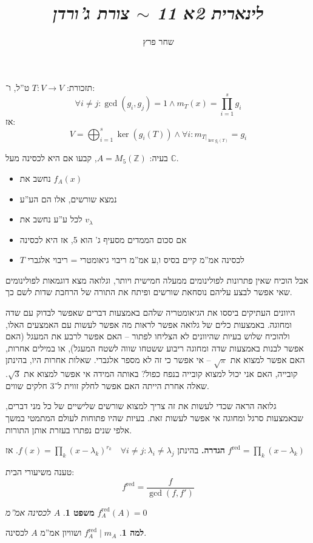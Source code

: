 \documentclass[]{article}
\author{שחר פרץ}
\title{\textit{לינארית 2א 11 $\sim$ צורת ג'ורדן}}
\newcommand\Z     {\mathbb{Z}}
\newcommand\C     {\mathbb{C}}
\newcommand\co        {\colon}
\renewcommand\lg      {\lambda}
\newtheorem{Theorem}{משפט}
\theoremstyle{definition}
\newtheorem{Lemma}{למה}
\newcommand\theo  [1] {\begin{Theorem}#1\end{Theorem}}
\newcommand\lem   [1] {\begin{Lemma}#1\end{Lemma}}
\begin{document}
    \maketitle
    תזכורת: $T \co V \to V$ ט''ל, ו־: 
    \[ \forall i \neq j \co \gcd(g_i, g_j) =1 \land m_T(x) = \prod_{i = 1}^{s}g_i \]
    אז: 
    \[ V = \bigoplus_{i = 1}^{s} \ker(g_i(T)) \land \forall i \co m_{T|_{\ker g_i(T)}} = g_i \]
    
    בעיה: $A = M_5(\Z)$, קבעו אם היא לכסינה מעל $\C$. 
    \begin{itemize}
        \item נחשב את $f_A(x)$
        \item נמצא שורשים, אלו הם הע''ע
        \item לכל ע''ע נחשב את $v_\lg$
        \item אם סכום הממדים מסעיף ג' הוא 5, אז היא לכסינה
        \item $T$ לכסינה אמ''מ קיים בסיס ו,ע אמ''מ ריבוי גיאומטרי = ריבוי אלגברי
    \end{itemize}
    
    אבל הוכיח שאין פתרונות לפולינומים ממעלה חמישית ויותר, וגלואה מצא דוגמאות לפולינומים שאי אפשר לבצע עליהם נוסחאת שורשים ופיתח את התורה של הרחבת שדות לשם כך. 
    
    היוונים העתיקים ביססו את הגיאומטריה שלהם באמצעות דברים שאפשר לבדוק עם שדה ומחוגה. באמצעות כלים של גלואה אפשר לראות מה אפשר לעשות עם האמצעים האלו, ולהוכיח שלוש בעיות שהיוונים לא הצליחו לפתור – האם אפשר לרבע את המעגל (האם אפשר לבנות באמצעות שדה ומחוגה ריבוע ששטחו שווה לשטח המעגל), או במילים אחרות, האם אפשר למצוא את $\sqrt\pi$ – אי אפשר כי זה לא מספר אלגברי. שאלות אחרות היו, בהינתן קובייה, האם אני יכול למצוא קובייה בנפח כפול? באותה המידה אי אפשר למצוא את $\sqrt3$. שאלה אחרת הייתה האם אפשר לחלק זווית ל־3 חלקים שווים. 
    
    גלואה הראה שכדי לעשות את זה צריך למצוא שורשים שלישיים של כל מני דברים, שבאמצעות סרגל ומחוגה אי אפשר לעשות זאת. בעיות שהיו פתוחות לעולם המתמטי במשך אלפי שנים נפתרו בעזרת אותן התורות. 
    
    \textbf{הגדרה. }בהינתן $f(x) = \prod_{k}(x - \lg_k)^{r_k} \quad \forall i \neq j \co \lg_i \neq \lg_j$. אז $f^{\mathrm{red}} = \prod_{k}(x - \lg_k)$
    
    טענה משיעורי הבית: 
    \[ f^{\mathrm{red}} = \frac{f}{\gcd(f, f')} \]
    
    \theo{$A$ לכסינה אמ''מ $f_A^{\mathrm{red}}(A) = 0$}
    
    \lem{$f_A^{\mathrm{red}} \mid m_A$ ושוויון אמ''מ $A$ לכסינה. }
    
\end{document}

